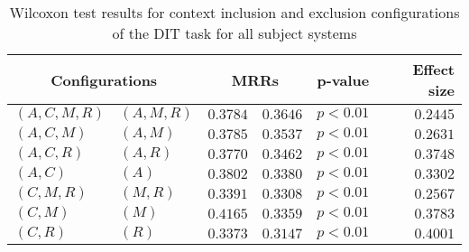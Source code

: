 
\begin{table}
\begin{spacing}{1.2}
\centering
\caption{Wilcoxon test results for context inclusion and exclusion configurations of the DIT task for all subject systems}
\label{table:versus-wilcox-all-dit-context}
\begin{tabular}{ll|rr|rr}
\toprule
      \multicolumn{2}{c|}{Configurations} &          \multicolumn{2}{c|}{MRRs} &       p-value & Effect size \\
\midrule
 $(A,C,M,R)$ &  $(A,M,R)$ & $0.3784$ & $0.3646$ & $p<0.01$ &    $0.2445$ \\
   $(A,C,M)$ &    $(A,M)$ & $0.3785$ & $0.3537$ & $p<0.01$ &    $0.2631$ \\
   $(A,C,R)$ &    $(A,R)$ & $0.3770$ & $0.3462$ & $p<0.01$ &    $0.3748$ \\
     $(A,C)$ &      $(A)$ & $0.3802$ & $0.3380$ & $p<0.01$ &    $0.3302$ \\
   $(C,M,R)$ &    $(M,R)$ & $0.3391$ & $0.3308$ & $p<0.01$ &    $0.2567$ \\
     $(C,M)$ &      $(M)$ & $0.4165$ & $0.3359$ & $p<0.01$ &    $0.3783$ \\
     $(C,R)$ &      $(R)$ & $0.3373$ & $0.3147$ & $p<0.01$ &    $0.4001$ \\
\bottomrule
\end{tabular}

\end{spacing}
\end{table}

